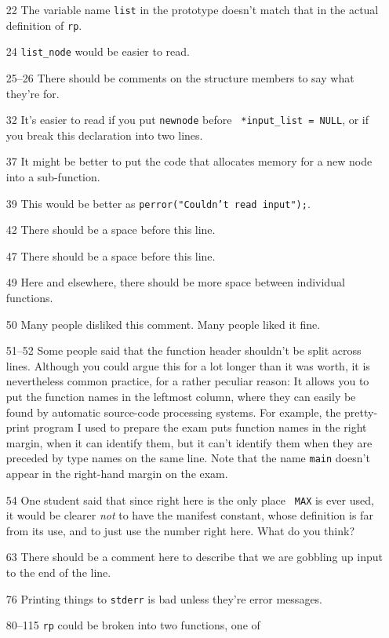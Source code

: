 \begin{itemize}
\item[22] The variable name {\tt list} in the prototype doesn't match
that in the actual definition of {\tt rp}. 
\item[24] {\tt list\_node} would be easier to read.
\item[25--26] There should be comments on the structure members to say
what they're for. 
\item[32] It's easier to read if you put {\tt *newnode} before {\tt
*input\_list = NULL}, or if you break this declaration into two lines.
\item[37] It might be better to put the code that allocates memory for a
new node into a sub-function.
\item[39] This would be better as {\tt perror("Couldn't read input");}. 
\item[42] There should be a space before this line.
\item[47] There should be a space before this line.
\item[49] Here and elsewhere, there should be more space between
individual functions.
\item[50] Many people disliked this comment.  Many people liked it fine.
\item[51--52] Some people said that the function header shouldn't be
split across lines.  Although you could argue this for a lot longer than
it was worth, it is nevertheless common practice, for a rather
peculiar reason:  It allows you to put the function names in the
leftmost column, where they can easily be found by automatic source-code
processing systems.  For example, the pretty-print program I used to
prepare the exam puts function names in the right margin, when it can
identify them, but it can't identify them when they are preceded by type
names on the same line.  Note that the name {\tt main} doesn't appear in
the right-hand margin on the exam. 
\item[54] One student said that since right here is the only place {\tt
MAX} is ever used, it would be clearer {\em not} to have the manifest
constant, whose definition is far from its use, and to just use the
number right here.  What do you think? 
\item[63] There should be a comment here to describe that we are
gobbling up input to the end of the line.
\item[76] Printing things to {\tt stderr} is bad unless they're error
messages. 
\item[80--115] {\tt rp} could be broken into two functions, one of

\end{itemize}
